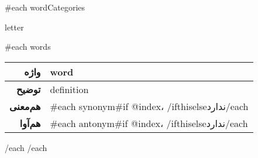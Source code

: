 {{#each wordCategories}}
\begin{center}
\begin{huge}
{{letter}}
\end{huge}
\end{center}
{{#each words}}
\begin{center}
	\def\arraystretch{1.4}%
	\begin{tabularx}{\textwidth}{|r|X|}
		\hline
		\textbf{واژه}
		&
			{{word}}
		\\ \hline
		\textbf{توضیح}
		&
			{{definition}}
		\\ \hline
		\textbf{هم‌معنی}
		&
			{{#each synonym}}{{#if @index}}، {{/if}}{{this}}{{else}}ندارد{{/each}}
		\\ \hline
		\textbf{هم‌آوا}
		&
			{{#each antonym}}{{#if @index}}، {{/if}}{{this}}{{else}}ندارد{{/each}}
		\\ \hline
	\end{tabularx}
\end{center}
{{/each}}
{{/each}}
